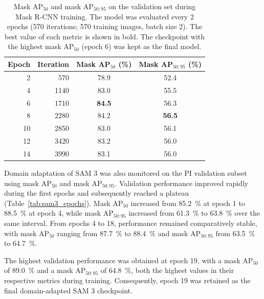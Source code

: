 \documentclass[12pt,a4paper]{article}
\begin{document}
\begin{table}[ht]
    \centering
    \caption{
        Mask AP$_{50}$ and mask AP$_{50:95}$ on the validation set during Mask R-CNN training. The model was evaluated every 2 epochs (570 iterations; 570 training images, batch size 2). The best value of each metric is shown in bold. The checkpoint with the highest mask AP$_{50}$ (epoch 6) was kept as the final model.
    }
    \label{tab:maskrcnn_iterations}
    \begin{tabular}{rrcc}
        \toprule
        Epoch & Iteration & Mask AP$_{50}$ (\%) & Mask AP$_{50:95}$ (\%) \\
        \midrule
        2 &  570 & 78.9          & 52.4 \\
        4 & 1140 & 83.0          & 55.5 \\
        6 & 1710 & \textbf{84.5} & 56.3 \\
        8 & 2280 & 84.2          & \textbf{56.5} \\
        10 & 2850 & 83.0          & 56.1 \\
        12 & 3420 & 83.2          & 56.0 \\
        14 & 3990 & 83.1          & 56.0 \\
        \bottomrule
    \end{tabular}
\end{table}

Domain adaptation of SAM 3 was also monitored on the PI validation subset using mask AP$_{50}$ and mask AP$_{50:95}$. Validation performance improved rapidly during the first epochs and subsequently reached a plateau (Table~\ref{tab:sam3_epochs}). Mask AP$_{50}$ increased from \qty{85.2}{\percent} at epoch 1 to \qty{88.5}{\percent} at epoch 4, while mask AP$_{50:95}$ increased from \qty{61.3}{\percent} to \qty{63.8}{\percent} over the same interval. From epochs 4 to 18, performance remained comparatively stable, with mask AP$_{50}$ ranging from \qty{87.7}{\percent} to \qty{88.4}{\percent} and mask AP$_{50:95}$ from \qty{63.5}{\percent} to \qty{64.7}{\percent}.

The highest validation performance was obtained at epoch 19, with a mask AP$_{50}$ of \qty{89.0}{\percent} and a mask AP$_{50:95}$ of \qty{64.8}{\percent}, both the highest values in their respective metrics during training. Consequently, epoch 19 was retained as the final domain-adapted SAM 3 checkpoint.
\end{document}
